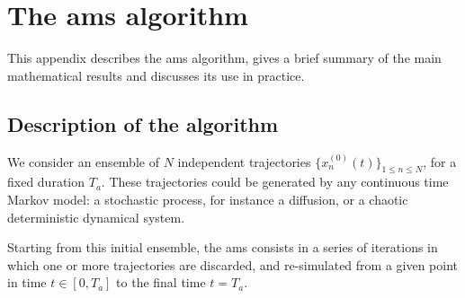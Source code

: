 \newtheorem{theo}{Theorem}

\section{The \ac{ams} algorithm}
\label{app_ams}

This appendix describes the \ac{ams} algorithm, gives a brief summary of the main
mathematical results and discusses its use in practice.
\subsection{Description of the algorithm}
We consider an ensemble of $N$ independent trajectories $\{x_n^{(0)}(t)\}_{1\leq n \leq N}$, for a fixed duration $T_a$.
These trajectories could be generated by any continuous time Markov model: a stochastic process, for instance a diffusion, or a chaotic deterministic dynamical system.

Starting from this initial ensemble, the \ac{ams} consists in a series of iterations in which one or more trajectories are discarded, and re-simulated from a given point in time $t \in [0, T_a]$ to the final time $t = T_a$.


